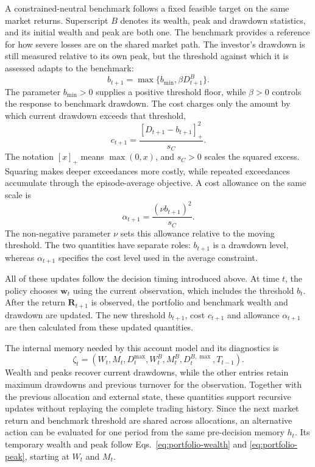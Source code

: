 \documentclass[10pt]{article}
\begin{document}
A constrained-neutral benchmark follows a fixed feasible target on the same market returns. Superscript $B$ denotes its wealth, peak and drawdown statistics, and its initial wealth and peak are both one. The benchmark provides a reference for how severe losses are on the shared market path. The investor's drawdown is still measured relative to its own peak, but the threshold against which it is assessed adapts to the benchmark:
\begin{equation}
  b_{t+1}=\max\{b_{\min},\beta D_{t+1}^B\}.
  \label{eq:portfolio-risk-threshold}
\end{equation}
The parameter $b_{\min}>0$ supplies a positive threshold floor, while $\beta>0$ controls the response to benchmark drawdown. The cost charges only the amount by which current drawdown exceeds that threshold,
\begin{equation}
  c_{t+1}=\frac{[D_{t+1}-b_{t+1}]_+^2}{s_C}.
  \label{eq:portfolio-cost}
\end{equation}
The notation $[x]_+$ means $\max(0,x)$, and $s_C>0$ scales the squared excess. Squaring makes deeper exceedances more costly, while repeated exceedances accumulate through the episode-average objective. A cost allowance on the same scale is
\begin{equation}
  \alpha_{t+1}=\frac{(\nu b_{t+1})^2}{s_C}.
  \label{eq:portfolio-alpha}
\end{equation}
The non-negative parameter $\nu$ sets this allowance relative to the moving threshold. The two quantities have separate roles: $b_{t+1}$ is a drawdown level, whereas $\alpha_{t+1}$ specifies the cost level used in the average constraint.

All of these updates follow the decision timing introduced above. At time \(t\), the policy chooses \(\boldsymbol w_t\) using the current observation, which includes the threshold \(b_t\). After the return \(\boldsymbol R_{t+1}\) is observed, the portfolio and benchmark wealth and drawdown are updated. The new threshold \(b_{t+1}\), cost \(c_{t+1}\) and allowance \(\alpha_{t+1}\) are then calculated from these updated quantities.

The internal memory needed by this account model and its diagnostics is
\begin{equation}
  \zeta_t=(W_t,M_t,D_t^{\max},
           W_t^B,M_t^B,D_t^{B,\max},T_{t-1}).
  \label{eq:portfolio-path-state}
\end{equation}
Wealth and peaks recover current drawdowns, while the other entries retain maximum drawdowns and previous turnover for the observation. Together with the previous allocation and external state, these quantities support recursive updates without replaying the complete trading history. Since the next market return and benchmark threshold are shared across allocations, an alternative action can be evaluated for one period from the same pre-decision memory $h_t$. Its temporary wealth and peak follow Eqs.~\eqref{eq:portfolio-wealth} and \eqref{eq:portfolio-peak}, starting at $W_t$ and $M_t$.
\end{document}
